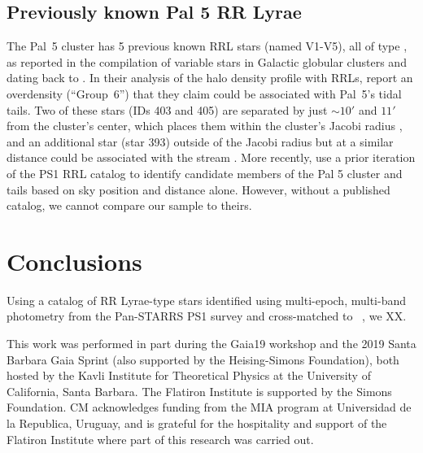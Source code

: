 \documentclass[twocolumn]{aastex63}
\begin{document}
{\subsection{Previously known Pal 5 RR Lyrae}

The Pal~5 cluster has 5 previous known RRL stars (named V1-V5), all of type \typec, as reported in the \citet{Clement:2001} compilation of variable stars in Galactic globular clusters and dating back to \citet{SawyerHogg:1973}.
In their analysis of the halo density profile with RRLs, \citet{Vivas:2006} report an overdensity (``Group~6'') that they claim could be associated with Pal~5's tidal tails.
Two of these stars (IDs 403 and 405) are separated by just $\sim10'$ and $11'$ from the cluster's center, which places them within the cluster's Jacobi radius \citep{Vivas:2004}, and an additional star (star 393) outside of the Jacobi radius but at a similar distance could be associated with the stream \citep{Vivas:2006}.
More recently, \citet{Ibata:2017} use a prior iteration of the PS1 RRL catalog \citep{Hernitschek:2016} to identify  candidate members of the Pal 5 cluster and tails based on sky position and distance alone.
However, without a published catalog, we cannot compare our sample to theirs.



\section{Conclusions} \label{sec:conclusions}

Using a catalog of RR Lyrae-type stars identified using multi-epoch, multi-band photometry from the Pan-STARRS PS1 survey and cross-matched to \Gaia\ , we XX.


\acknowledgments
This work was performed in part during the Gaia19 workshop and the 2019 Santa Barbara Gaia Sprint (also supported by the Heising-Simons Foundation), both hosted by the Kavli Institute for Theoretical Physics at the University of California, Santa Barbara. The Flatiron Institute is supported by the Simons Foundation. CM acknowledges funding from the MIA program at Universidad de la Republica, Uruguay, and is grateful for the hospitality and support of the Flatiron Institute where part of this research was carried out.

}
\end{document}
